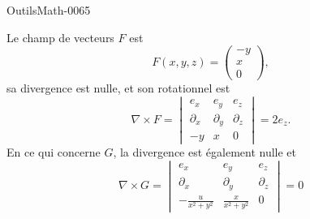
\begin{corrige}{OutilsMath-0065}

    Le champ de vecteurs $F$ est 
    \begin{equation}
        F(x,y,z)=\begin{pmatrix}
            -y    \\ 
            x    \\ 
            0    
        \end{pmatrix},
    \end{equation}
    sa divergence est nulle,  et son rotationnel est
    \begin{equation}
        \nabla\times F=\begin{vmatrix}
            e_x    &  e_y     &   e_z    \\
            \partial_x    &   \partial_y    &   \partial_z    \\
            -y    &   x    &   0
        \end{vmatrix}=2e_z.
    \end{equation}
    En ce qui concerne $G$, la divergence est également nulle et
    \begin{equation}
        \nabla\times G=\begin{vmatrix}
            e_x &   e_y &   e_z \\
            \partial_x  &   \partial_y  &   \partial_z  \\
            -\frac{ u }{ x^2+y^2 }    &   \frac{ x }{ x^2+y^2 }    &   0
        \end{vmatrix}=0
    \end{equation}

\end{corrige}
